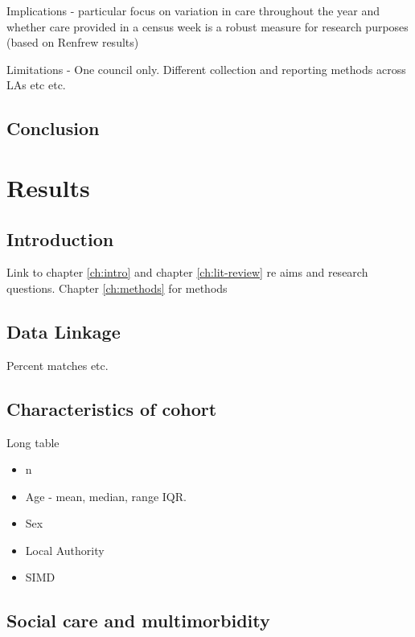 \documentclass[12pt,]{report}
\begin{document}
Implications - particular focus on variation in care throughout the year
and whether care provided in a census week is a robust measure for
research purposes (based on Renfrew results)

Limitations - One council only. Different collection and reporting
methods across LAs etc etc.

\section{Conclusion}\label{sec:renf-conc}

\FloatBarrier
\newpage
{}

\chapter{Results}\label{ch:results}

\section{Introduction}\label{sec:social-care-intro}

Link to chapter \ref{ch:intro} and chapter \ref{ch:lit-review} re aims
and research questions. Chapter \ref{ch:methods} for methods

\section{Data Linkage}\label{sec:res-linkage}

Percent matches etc.

\section{Characteristics of cohort}

Long table

\begin{itemize}[noitemsep]
\item n
\item Age - mean, median, range IQR.
\item Sex
\item Local Authority
\item SIMD
\end{itemize}

\section{Social care and multimorbidity}\label{sec:sc-mm}
\end{document}
